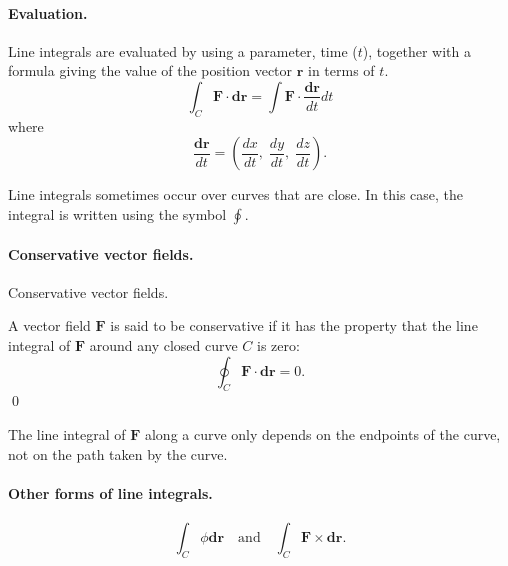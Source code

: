 \paragraph{Evaluation.}
Line integrals are evaluated by using a parameter, time ($t$), together with a formula giving the value of the position vector $\bm{r}$ in terms of $t$.
\begin{equation}
    \int_C \bm{F} \cdot \bm{dr}
    = \int \bm{F} \cdot \frac{\bm{dr}}{dt} dt 
\end{equation}
where 
\begin{equation}
    \frac{\bm{dr}}{dt} 
    = \left( \frac{dx}{dt},\; \frac{dy}{dt},\; \frac{dz}{dt} \right).
\end{equation}

Line integrals sometimes occur over curves that are close. 
In this case, the integral is written using the symbol $\oint$. 

\paragraph{Conservative vector fields. }
\begin{definition}
    Conservative vector fields. 
    
    A vector field $\bm{F}$ is said to be conservative if it has the property that the line integral of $\bm{F}$ around any closed curve $C$ is zero:
    \begin{equation}
        \oint_C \bm{F} \cdot \bm{dr} = 0.
    \end{equation}
    \qed
\end{definition}
The line integral of $\bm{F}$ along a curve only depends on the endpoints of the curve, not on the path taken by the curve.

\paragraph{Other forms of line integrals. }
\begin{equation}
    \int_C \phi \bm{dr}
    \quad \mathrm{and} \quad
    \int_C \bm{F} \times \bm{dr}. 
\end{equation}

